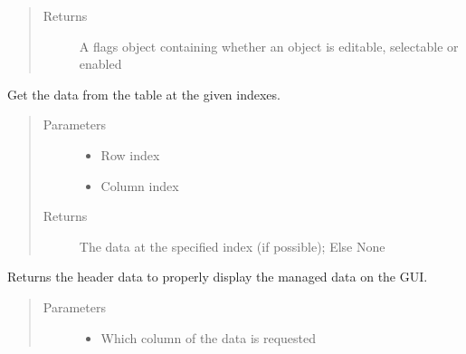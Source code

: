 \documentclass[letterpaper,10pt,english]{sphinxmanual}
\begin{document}
\begin{fulllineitems}
\begin{fulllineitems}
\begin{quote}
\begin{description}
\item[{Returns}] \leavevmode
A flags object containing whether an object is editable, selectable or enabled

\end{description}\end{quote}

\end{fulllineitems}


\begin{fulllineitems}
\label{\detokenize{src:src.PacketTableModel.PacketTableModel.getValue}}
Get the data from the table at the given indexes.
\begin{quote}\begin{description}
\item[{Parameters}] \leavevmode\begin{itemize}
\item {} 
 \textendash{} Row index

\item {} 
 \textendash{} Column index

\end{itemize}

\item[{Returns}] \leavevmode
The data at the specified index (if possible); Else None

\end{description}\end{quote}

\end{fulllineitems}


\begin{fulllineitems}
\label{\detokenize{src:src.PacketTableModel.PacketTableModel.headerData}}
Returns the header data to properly display the managed data on the GUI.
\begin{quote}\begin{description}
\item[{Parameters}] \leavevmode\begin{itemize}
\item {} 
 \textendash{} Which column of the data is requested


\end{itemize}
\end{description}
\end{quote}
\end{fulllineitems}
\end{fulllineitems}
\end{document}
